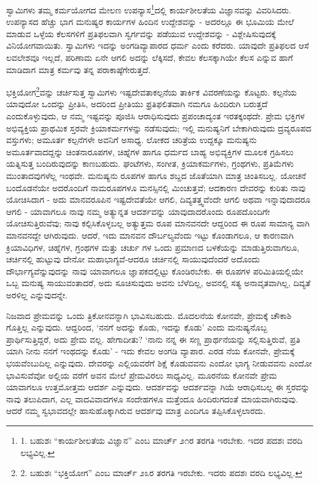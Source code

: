 ಸ್ವಾಮಿಗಳು ತಮ್ಮ ಕರ್ಮಯೋಗದ ಮೇಲಣ ಉಪನ್ಯಾಸ\footnote{1. ಬಹುಶಃ “ಕಾರ್ಯಶೀಲತೆಯ ವಿಜ್ಞಾನ” ಎಂಬ ಮಾರ್ಚ್ ೨೧ರ ತರಗತಿ ಇರಬೇಕು. ಇದರ ಪದಶಃ ವರದಿ ಲಭ್ಯವಿಲ್ಲ.}ದಲ್ಲಿ ಕಾರ್ಯಶೀಲತೆಯ ವಿಜ್ಞಾನವನ್ನು ವಿವರಿಸಿದರು. ಉಪನ್ಯಾಸದ ಹೆಚ್ಚು ಭಾಗ ಮನುಷ್ಯರ ಕಾರ್ಯಗಳ ಹಿಂದಿನ ಉದ್ದೇಶವನ್ನು - ಅದರಲ್ಲೂ ಈ ಭೂಮಿಯ ಮೇಲೆ ಮಾಡುವ ಒಳ್ಳೆಯ ಕೆಲಸಗಳಿಗೆ ಪ್ರತಿಫಲವಾಗಿ ಸ್ವರ್ಗವನ್ನು ಪಡೆಯುವ ಉದ್ದೇಶವನ್ನು - ವಿಶ್ಲೇಷಿಸುವುದಕ್ಕೆ ವಿನಿಯೋಗವಾಯಿತು. ಸ್ವಾಮಿಗಳು ಇದನ್ನು ಅಂಗಡಿವ್ಯಾಪಾರದ ಧರ್ಮ ಎಂದು ಕರೆದರು. ಯಾವುದೇ ಪ್ರತಿಫಲದ ಆಸೆ ಲವಲೇಶವೂ ಇಲ್ಲದೆ, ಪರಿಣಾಮ ಏನೇ ಆಗಲಿ ಅದನ್ನು ಲೆಕ್ಕಿಸದೆ, ಕೇವಲ ಕೆಲಸಕ್ಕಾಗಿಯೇ ಕೆಲಸ ಎನ್ನುವ ಹಾಗೆ ಮಾಡಿದಾಗ ಮಾತ್ರ ಕರ್ಮವು ತನ್ನ ಪರಾಕಾಷ್ಠೆಗೇರುತ್ತದೆ.

ಭಕ್ತಿಯೋಗ\footnote{2. ಬಹುಶಃ “ಭಕ್ತಿಯೋಗ” ಎಂಬ ಮಾರ್ಚ್ ೨೩ರ ತರಗತಿ ಇರಬೇಕು. ಇದರು ಪದಶಃ ವರದಿ ಲಭ್ಯವಿಲ್ಲ.}ವನ್ನು ಚರ್ಚಿಸುತ್ತ ಸ್ವಾಮಿಗಳು ಇಷ್ಟದೇವತಾಕಲ್ಪನೆಯ ತಾರ್ಕಿಕ ವಿವರಣೆಯನ್ನು ಕೊಟ್ಟರು. ಕಲ್ಪನೆಯ ಯಾವುದೋ ಒಂದನ್ನು ಪ್ರೀತಿಸಿ, ಅದರಿಂದ ಪ್ರೀತಿಯು ಫ್ರತಿಫಲಿತವಾಗಿ ನಮಗೂ ಹಿಂದಿರುಗಿ ಬರುತ್ತದೆ ಎಂದುಕೊಳ್ಳುವುದು, ಆ ನಮ್ಮ ಇಷ್ಟವನ್ನು ಪೂಜಿಸಿ ಆರಾಧಿಸುವುದು ಪ್ರಪಂಚಾದ್ಯಂತ ಇರತಕ್ಕಂಥದೇ. ಪ್ರೇಮ ಭಕ್ತಿಗಳ ಅಭಿವ್ಯಕ್ತಿಯ ಪ್ರಾಥಮಿಕ ಸ್ತರವೇ ಕ್ರಿಯಾಕರ್ಮಗಳನ್ನು ನಡೆಸುವುದು; ಇಲ್ಲಿ ಮನುಷ್ಯನಿಗೆ ಬೇಕಾಗಿರುವುದು ದ್ರವ್ಯರೂಪದ ವಸ್ತುಗಳು; ಅಮೂರ್ತ ಕಲ್ಪನೆಗಳೇ ಅವನಿಗೆ ಅಸಾಧ್ಯ. ಲೋಕದ ಚರಿತ್ರೆಯ ಉದ್ದಕ್ಕೂ ಮನುಷ್ಯನು ಅಮೂರ್ತವಾದದ್ದನ್ನು ಚಿಂತನಾರೂಪಗಳ, ಚಿಹ್ನೆಗಳ ಹಾಗೂ ಧರ್ಮದ ಬಾಹ್ಯ ಅಭಿವ್ಯಕ್ತಿಗಳ ಮೂಲಕ ಗ್ರಹಿಸಲು ಯತ್ನಿಸುತ್ತ ಬಂದಿರುವುದನ್ನು ಕಾಣಬಹುದು. ಘಂಟೆಗಳು, ಸಂಗೀತ, ಕ್ರಿಯಾಕರ್ಮಗಳು, ಗ್ರಂಥಗಳು, ಪ್ರತಿಮೆಗಳು ಮುಂತಾದವುಗಳೆಲ್ಲ ಇಂಥವೇ. ಮನುಷ್ಯನು ರೂಪಗಳ ಹಾಗೂ ಶಬ್ದದ ಜೊತೆಯಾಗಿ ಮಾತ್ರ ಚಿಂತಿಸಬಲ್ಲ. ಯೋಚನೆ ಬಂದೊಡನೆಯೇ ಅದರೊಂದಿಗೆ ನಾಮರೂಪಗಳೂ ಮನಸ್ಸಿನಲ್ಲಿ ಮಿಂಚುತ್ತವೆ; ಆದಕಾರಣ ದೇವರನ್ನು ಕುರಿತು ನಾವು ಯೋಚಿಸಿದಾಗ - ಅದು ಮಾನವರೂಪಿನ ಇಷ್ಟದೇವತೆಯೇ ಆಗಲಿ, ದಿವ್ಯತತ್ತ್ವವೆಂದೇ ಆಗಲಿ ಅಥವಾ ಇನ್ನಾವುದಾದರೂ ಆಗಲಿ - ಯಾವಾಗಲೂ ನಾವು ನಮ್ಮ ಅತ್ಯುನ್ನತ ಆದರ್ಶವನ್ನು ಯಾವುದಾದರೊಂದು ರೂಪದೊಂದಿಗೇ ಯೋಚಿಸುತ್ತಿರುವೆವು; ನಾವು ಕಲ್ಪಿಸಿಕೊಳ್ಳಬಲ್ಲ ಅತ್ಯುತ್ತಮ ರೂಪ ಮಾನವನದೇ ಆದ್ದರಿಂದ ಈ ರೂಪ ಸಾಮಾನ್ಯ ವಾಗಿ ಮಾನವನದ್ದೇ ಆಗಿರುವುದು. ಆದರೆ, ಇದು ಮಾನವನ ದೌರ್ಬಲ್ಯವೆಂದು ಇಟ್ಟು ಕೊಂಡಾಗಲೂ, ಆ ಕಾರಣವಾಗಿ ಕ್ರಿಯಾವಿಧಿಗಳ, ಚಿಹ್ನೆಗಳ, ಗ್ರಂಥಗಳ ಮತ್ತು ಚರ್ಚು ಗಳ ಒಂದು ಪ್ರಮಾಣದ ಬಳಕೆಯನ್ನು ಮಾಡುತ್ತಿರುವಾಗಲೂ, ಚರ್ಚಿನಲ್ಲಿ ಹುಟ್ಟುವು ದೇನೋ ಮಹಾಭಾಗ್ಯವೆ-ಆದರೂ ಚರ್ಚಿನಲ್ಲಿ ಸಾಯುವುದೆಂದರೆ ಅದೊಂದು ದೌರ್ಭಾಗ್ಯವೆನ್ನುವುದನ್ನು ನಾವು ಯಾವಾಗಲೂ ಜ್ಞಾಪಕದಲ್ಲಿಟ್ಟು ಕೊಂಡಿರಬೇಕು. ಈ ರೂಪಗಳ ಪರಿಮಿತಿಯಲ್ಲಿಯೇ ಒಬ್ಬ ಮನುಷ್ಯ ಸಾಯುವಂತಾದರೆ, ಅದು ಸೂಚಿಸುವುದು ಅವನು ಬೆಳೆದಿಲ್ಲ, ಅವನಲ್ಲಿ ಸತ್ಯ ಅನಾವೃತವಾಗಿಲ್ಲ, ದಿವ್ಯತೆ ಅರಳಿಲ್ಲ ಎನ್ನುವುದನ್ನೇ.

ನಿಜವಾದ ಪ್ರೇಮವನ್ನು ಒಂದು ತ್ರಿಕೋನವನ್ನಾಗಿ ಭಾವಿಸಬಹುದು. ಮೊದಲನೆಯ ಕೋನವೇ, ಪ್ರೇಮಕ್ಕೆ ಚೌಕಾಶಿ ಗೊತ್ತಿಲ್ಲ ಎನ್ನುವುದು. ಆದ್ದರಿಂದ, ‘ನನಗೆ ಅದನ್ನು ಕೊಡು, ಇದನ್ನು ಕೊಡು’ ಎಂದು ಮನುಷ್ಯನೊಬ್ಬ ಪ್ರಾರ್ಥಿಸುತ್ತಿದ್ದರೆ, ಅದು ಪ್ರೇಮ ವಲ್ಲ. ಹೇಗಾದೀತು? ‘ನಾನು ನನ್ನ ಈ ಸಣ್ಣ ಪ್ರಾರ್ಥನೆಯನ್ನು ಸಲ್ಲಿಸುತ್ತಿರುವೆ, ಪ್ರತಿ ಯಾಗಿ ನೀನು ನನಗೆ ಇಂಥದನ್ನು ಕೊಡು’ - ಇದು ಕೇವಲ ಅಂಗಡಿ ವ್ಯಾಪಾರ. ಎರಡ ನೆಯ ಕೋನವೇ, ಪ್ರೇಮಕ್ಕೆ ಭಯವೆಂಬುದಿಲ್ಲ ಎನ್ನುವುದು. ದೇವರನ್ನು ಎಲ್ಲಿಯವರೆಗೆ ಶಿಕ್ಷೆ ಕೊಡುವವನು ಎಂದೋ ಭಾಗ್ಯ ನೀಡುವವನು ಎಂದೋ ಭಾವಿಸುವೆವೋ ಅಲ್ಲಿಯ ವರೆಗೆ ಅವನ ಮೇಲೆ ಪ್ರೇಮವಿರಲು ಸಾಧ್ಯವಿಲ್ಲ. ಮೂರನೆಯ ಕೋನವೇ ಪ್ರೇಮ ಯಾವಾಗಲೂ ಉತ್ತಮೋತ್ತಮ ಆದರ್ಶ ಎನ್ನುವುದು. ಆದರ್ಶವನ್ನು ಆದರ್ಶವನ್ನಾ ಗಿಯೆ ಆರಾಧಿಸಬಲ್ಲ ಈ ಸ್ತರವನ್ನು ನಾವು ತಲುಪಿದಾಗ, ಎಲ್ಲ ವಾದವಿವಾದಗಳೂ ಸಂದೇಹಗಳೂ ಮತ್ತೆಂದೂ ಹಿಂದಿರುಗದಂತೆ ಮಾಯವಾಗಿರುವುವು. ಆದರೆ ನಮ್ಮ ಸ್ವಭಾವದಲ್ಲೇ ಹಾಸುಹೊಕ್ಕಾಗಿರುವ ಆದರ್ಶವು ಮಾತ್ರ ಎಂದಿಗೂ ತಪ್ಪಿಸಿಕೊಳ್ಳಲಾರದು.

